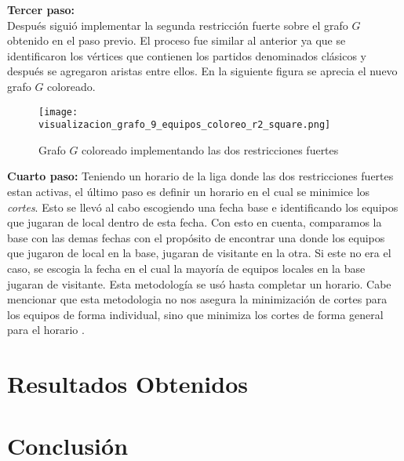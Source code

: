 \documentclass[11pt]{article}
\begin{document}
\begin{multicols}{2}
            \textbf{Tercer paso:}\\ 
            Después siguió implementar la segunda restricción fuerte sobre el grafo $G$ obtenido en el paso previo.
            El proceso fue similar al anterior ya que se identificaron los vértices que contienen los 
            partidos denominados clásicos y después se agregaron aristas entre ellos. En la siguiente figura se aprecia el nuevo grafo $G$ coloreado.
            \begin{figure}[H]
                \begin{center}
                    \texttt{[image: visualizacion\_grafo\_9\_equipos\_coloreo\_r2\_square.png]}  
                \caption{Grafo $G$ coloreado implementando las dos restricciones fuertes}
                \end{center}
            \end{figure}
            \textbf{Cuarto paso:}
            Teniendo un horario de la liga donde las dos restricciones fuertes estan activas, el último paso es definir un horario en el cual se minimice los \textit{cortes}.
            Esto se llevó al cabo escogiendo una fecha base e identificando los equipos que jugaran de local dentro de esta fecha. Con esto en cuenta, comparamos 
            la base con las demas fechas con el propósito de encontrar una donde los equipos que jugaron de local en la base, jugaran de visitante en la otra.
            Si este no era el caso, se escogia la fecha en el cual la mayoría de equipos locales en la base jugaran de visitante. Esta metodología se usó hasta completar un horario.   
            Cabe mencionar que esta metodologia no nos asegura la minimización de cortes para los equipos de forma individual, sino que minimiza los cortes de forma general para el horario
            . 




        \section{Resultados Obtenidos}
        \section{Conclusión}
            
        
        

    \end{multicols}
\end{document}
